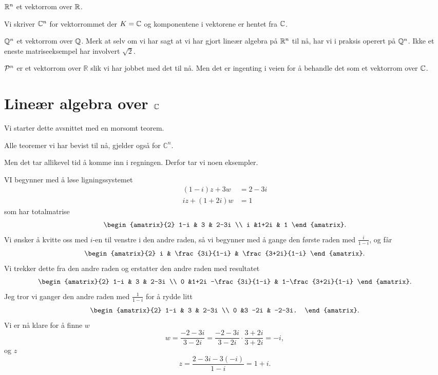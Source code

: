 \begin{ex}
$\R^n$ et vektorrom over $\R$.
\end{ex}

\begin{ex}
Vi skriver $\C^n$ for vektorrommet der $K=\C$ og komponentene i vektorene er hentet fra $\C$.
\end{ex}

\begin{ex}
$\Q^n$ et vektorrom over $\Q$. Merk at selv om vi har sagt at vi har gjort lineær algebra på $\R^n$ til nå, har vi i praksis operert på $\Q^n$. Ikke et eneste matriseeksempel har involvert $\sqrt{2}$.
\end{ex}

\begin{ex}
$\P^n$ er et vektorrom over $\mathbb R$ slik vi har jobbet med det til nå. 
Men det er ingenting i veien for å behandle det som et vektorrom over $\C$.
\end{ex}





\section*{Lineær algebra over $\C$}

Vi starter dette avsnittet med en morsomt teorem.

\begin{thm}
Alle teoremer vi har bevist til nå, gjelder også for $\mathbb C^n$. 
\end{thm}

Men det tar allikevel tid å komme inn i regningen. Derfor tar vi noen eksempler.

\begin{ex}
VI begynner med å løse ligningssystemet
\begin{align*}
(1-i) z + 3w   &= 2-3i \\
i z + (1+2i) w &= 1
\end{align*}
som har totalmatrise
\[
\begin{amatrix}{2}
1-i & 3 & 2-3i \\ i &1+2i & 1
\end{amatrix}.
\]
Vi ønsker å kvitte oss med $i$-en til venstre i den andre raden, så vi begynner med å gange den første raden med $\frac{i}{1-i}$, og får
\[
\begin{amatrix}{2}
i & \frac{3i}{1-i} & \frac{3+2i}{1-i} 
\end{amatrix}.
\]
Vi trekker dette fra den andre raden og erstatter den andre raden med resultatet
\[
\begin{amatrix}{2}
1-i & 3 & 2-3i \\ 0 &1+2i -\frac{3i}{1-i} & 1-\frac{3+2i}{1-i} 
\end{amatrix}.
\]
Jeg tror vi ganger den andre raden med $\frac{1}{1-i}$ for å rydde litt
\[
\begin{amatrix}{2}
1-i & 3 & 2-3i \\ 0 &3 -2i  & -2-3i.
\end{amatrix}.
\]
Vi er nå klare for å finne $w$
\[
w=\frac{-2-3i}{3-2i}=\frac{-2-3i}{3-2i}\cdot \frac{3+2i}{3+2i}=-i,
\]
og $z$
\[
z=\frac{2-3i-3(-i)}{1-i}=1+i.
\]
\end{ex}

